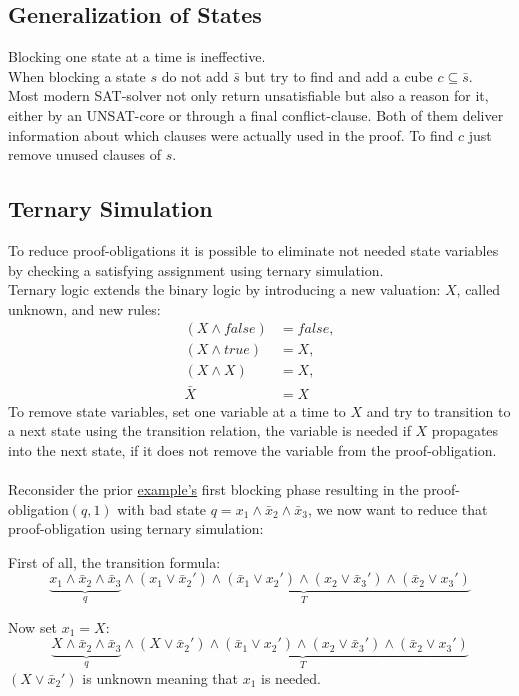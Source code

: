 \documentclass[11pt, a4paper, BCOR=10mm, ngerman]{scrbook}
\begin{document}
\subsection{Generalization of States}
Blocking one state at a time is ineffective.  \\
When blocking a state $s$ do not add $\bar s$ but try to find and add a cube $c \subseteq \bar s$. \\
Most modern SAT-solver not only return unsatisfiable but also a reason for it, either by an UNSAT-core or through a final conflict-clause. Both of them deliver information about which clauses were actually used in the proof. To find $c$ just remove unused clauses of $s$.

\subsection{Ternary Simulation}
To reduce proof-obligations it is possible to eliminate not needed state variables by checking a satisfying assignment using ternary simulation. \\
Ternary logic extends the binary logic by introducing a new valuation: $X$, called unknown, and new rules:
\begin{align*}
(X \land false) &= false, \\ (X \land true) &= X, \\ (X \land X) &= X, \\ \bar X &= X
\end{align*}
To remove state variables, set one variable at a time to $X$ and try to transition to a next state using the transition relation, the variable is needed if $X$ propagates into the next state, if it does not remove the variable from the proof-obligation. \\ \\
Reconsider the prior \hyperref[ex2]{example's} first blocking phase resulting in the proof-obligation$(q, 1)$ with bad state $q = x_1 \land \bar x_2 \land \bar x_3$, we now want to reduce that proof-obligation using ternary simulation: \par


First of all, the transition formula:
\begin{equation*}
\underbrace{x_1 \land \bar x_2 \land \bar x_3}_{q} \land \underbrace{(x_1 \lor \bar x_2' ) \land ( \bar x_1 \lor x_2') \land (x_2 \lor \bar x_3') \land ( \bar x_2 \lor x_3')}_{T}
\end{equation*}

Now set $x_1 = X$: \\
\begin{equation*}
\underbrace{X \land \bar x_2 \land \bar x_3}_{q} \land \underbrace{(X \lor \bar x_2' ) \land ( \bar x_1 \lor x_2') \land (x_2 \lor \bar x_3') \land ( \bar x_2 \lor x_3')}_{T}
\end{equation*}
$(X \lor \bar x_2')$ is unknown meaning that $x_1$  is needed. \\ \\
\end{document}
